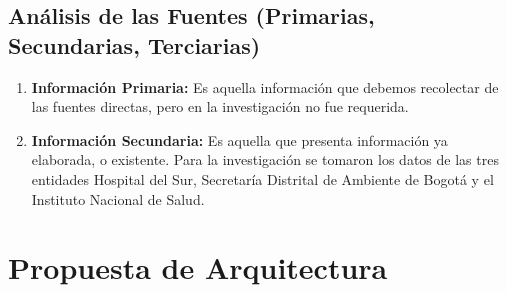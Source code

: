 \documentclass[a4paper,openright,12pt]{book}
\theoremstyle{definition}
\theoremstyle{remark}
\begin{document}
    \subsection{Análisis de las Fuentes (Primarias, Secundarias, Terciarias)}
    \begin{enumerate}
		\item \textbf{Información Primaria:} Es aquella información que debemos recolectar de las fuentes directas, pero en la investigación no fue requerida.
        \item \textbf{Información Secundaria:} Es aquella que presenta información ya elaborada, o existente. Para la investigación se tomaron los datos de las tres entidades Hospital del Sur, Secretaría Distrital de Ambiente de Bogotá y el Instituto Nacional de Salud.
	\end{enumerate}
\section{Propuesta de Arquitectura}
\end{document}
